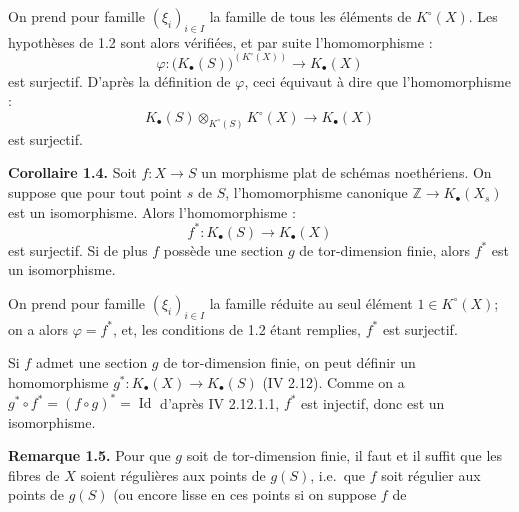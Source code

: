 On
prend pour famille $(\xi_i)_{i\in I}$ la famille de tous les éléments de $K^\circ(X)$. Les hypothèses de 1.2 sont alors vérifiées, et par suite l'homomorphisme :
\[
\varphi:\bigl(K_\bullet(S)\bigr)^{(K^\circ(X))}\longrightarrow K_\bullet(X)
\]
est surjectif. D'après la définition de $\varphi$, ceci équivaut à dire que l'homomorphisme :
\[
K_\bullet(S)\otimes_{K^\circ(S)}K^\circ(X)\longrightarrow K_\bullet(X)
\]
est surjectif.

\textbf{Corollaire 1.4.} Soit $f:X\to S$ un morphisme plat de schémas noethériens. On suppose que pour tout point $s$ de $S$, l'homomorphisme canonique $\mathbb Z\to K_\bullet(X_s)$ est un isomorphisme. Alors l'homomorphisme :
\[
f^*:K_\bullet(S)\longrightarrow K_\bullet(X)
\]
est surjectif. Si de plus $f$ possède une section $g$ de tor-dimension finie, alors $f^*$ est un isomorphisme.

On prend pour famille $(\xi_i)_{i\in I}$ la famille réduite au seul élément $1\in K^\circ(X)$; on a alors $\varphi=f^*$, et, les conditions de 1.2 étant remplies, $f^*$ est surjectif.

Si $f$ admet une section $g$ de tor-dimension finie, on peut définir un homomorphisme $g^*:K_\bullet(X)\to K_\bullet(S)$ (IV 2.12). Comme on a $g^*\circ f^*=(f\circ g)^*=\operatorname{Id}$ d'après IV 2.12.1.1, $f^*$ est injectif, donc est un isomorphisme.

\textbf{Remarque 1.5.} Pour que $g$ soit de tor-dimension finie, il faut et il suffit que les fibres de $X$ soient régulières aux points de $g(S)$, i.e.\ que $f$ soit régulier aux points de $g(S)$ (ou encore lisse en ces points si on suppose $f$ de
